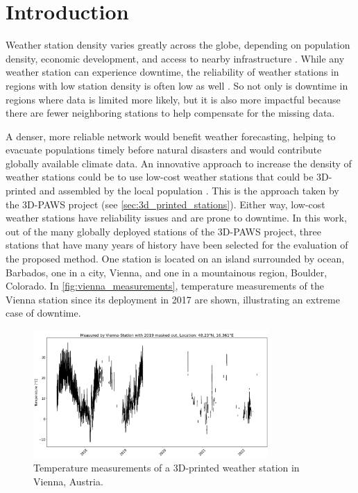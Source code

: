 \section{Introduction}
\label{sec:introduction}


Weather station density varies greatly across the globe, depending on population density, economic development, and access to nearby infrastructure \cite{ortizbobea2021}.
While any weather station can experience downtime, the reliability of weather stations in regions with low station density is often low as well \cite{Mistry2022GlobalWS}.
So not only is downtime in regions where data is limited more likely, but it is also more impactful because there are fewer neighboring stations to help compensate for the missing data.

A denser, more reliable network would benefit weather forecasting, helping to evacuate populations timely before natural disasters \cite{muita2021} and would contribute globally available climate data.
An innovative approach to increase the density of weather stations could be to use low-cost weather stations that could be 3D-printed and assembled by the local population \cite{muita2021}. This is the approach taken by the 3D-PAWS project (see \autoref{sec:3d_printed_stations}).
Either way, low-cost weather stations have reliability issues and are prone to downtime. In this work, out of the many globally deployed stations of the 3D-PAWS project, three stations that have many years of history have been selected for the evaluation of the proposed method. One station is located on an island surrounded by ocean, Barbados, one in a city, Vienna, and one in a mountainous region, Boulder, Colorado. In \autoref{fig:vienna_measurements}, temperature measurements of the Vienna station since its deployment in 2017 are shown, illustrating an extreme case of downtime.

\begin{figure}
    \centering
    \includegraphics[width=0.8\textwidth]{resources/images/charts/vienna_available_measurements_bw.png}
    \caption{Temperature measurements of a 3D-printed weather station in Vienna, Austria.}
    \label{fig:vienna_measurements}
\end{figure}

